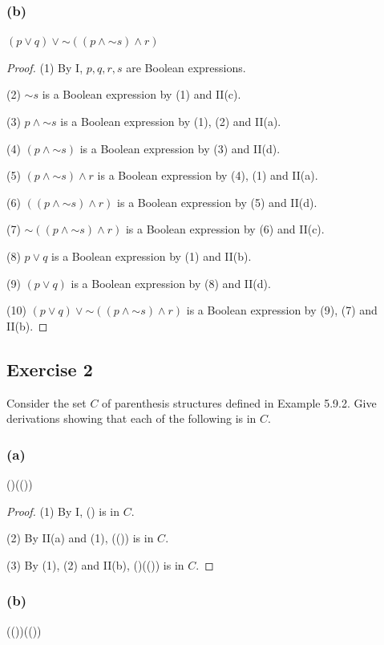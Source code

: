 \documentclass[14pt]{extarticle}
\begin{document}
\subsubsection{(b)}
\((p \vee q) \vee {\sim ((p \wedge {\sim s}) \wedge r)}\)

\begin{proof}
(1) By I, $p, q, r, s$ are Boolean expressions. 

(2) \({\sim s}\) is a Boolean expression by (1) and II(c).

(3) \(p \wedge {\sim s}\) is a Boolean expression by (1), (2) and II(a).

(4) \((p \wedge {\sim s})\) is a Boolean expression by (3) and II(d).

(5) \((p \wedge {\sim s}) \wedge r\) is a Boolean expression by (4), (1) and II(a).

(6) \(((p \wedge {\sim s}) \wedge r)\) is a Boolean expression by (5) and II(d).

(7) \({\sim ((p \wedge {\sim s}) \wedge r)}\) is a Boolean expression by (6) and II(c).

(8) \(p \vee q\) is a Boolean expression by (1) and II(b).

(9) \((p \vee q)\) is a Boolean expression by (8) and II(d).

(10) \((p \vee q) \vee {\sim ((p \wedge {\sim s}) \wedge r)}\) is a Boolean expression by (9), (7) and II(b).
\end{proof}

\subsection{Exercise 2}
Consider the set $C$ of parenthesis structures defined in Example 5.9.2. 
Give derivations showing that each of the following is in $C$.

\subsubsection{(a)}
()(())

\begin{proof}
(1) By I, () is in $C$.

(2) By II(a) and (1), (()) is in $C$.

(3) By (1), (2) and II(b), ()(()) is in $C$.
\end{proof}

\subsubsection{(b)}
(())(())
\end{document}
